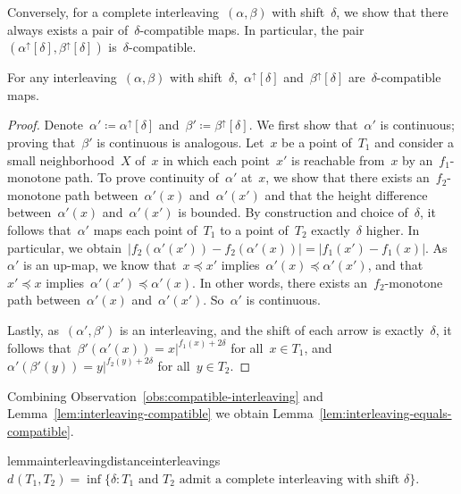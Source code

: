 \documentclass[a4paper,UKenglish, autoref, thm-restate, cleveref]{lipics-v2021}
\newcommand{\an}[2]{#1|^{#2}}
\newcommand{\intdist}[1]{d^{{#1}}}
\renewcommand{\mid}{:}
\begin{document}
\noindent
Conversely, for a complete interleaving~$(\alpha, \beta)$ with shift~$\delta$, we show that there always exists a pair of~$\delta$-compatible maps.
In particular, the pair~$(\alpha^\uparrow[\delta],\beta^\uparrow[\delta])$ is~$\delta$-compatible.

\begin{lemma}\label{lem:interleaving-compatible}
For any interleaving~$(\alpha, \beta)$ with shift~$\delta$,~$\alpha^\uparrow[\delta]$ and~$\beta^\uparrow[\delta]$ are~$\delta$-compatible maps.
\end{lemma}
\begin{proof}
    Denote~$\alpha' \coloneqq \alpha^\uparrow[\delta]$ and~$\beta' \coloneqq \beta^\uparrow[\delta]$.
	We first show that~$\alpha'$ is continuous; proving that~$\beta'$ is continuous is analogous.
	Let~$x$ be a point of~$T_1$ and consider a small neighborhood~$X$ of~$x$ in which each point~$x'$ is reachable from~$x$ by an~$f_1$-monotone path.
	To prove continuity of~$\alpha'$ at~$x$, we show that there exists an~$f_2$-monotone path between~$\alpha'(x)$ and~$\alpha'(x')$ and that the height difference between~$\alpha'(x)$ and~$\alpha'(x')$ is bounded.
    By construction and choice of~$\delta$, it follows that~$\alpha'$ maps each point of~$T_1$ to a point of~$T_2$ exactly~$\delta$ higher.
    In particular, we obtain~$|f_2(\alpha'(x')) - f_2(\alpha'(x))| = |f_1(x') - f_1(x)|$.
	As~$\alpha'$ is an up-map, we know that~$x \preceq x'$ implies~$\alpha'(x) \preceq \alpha'(x')$, and that~$x' \preceq x$ implies~$\alpha'(x') \preceq \alpha'(x)$.
    In other words, there exists an~$f_2$-monotone path between~$\alpha'(x)$ and~$\alpha'(x')$.
	So~$\alpha'$ is continuous.
	
	Lastly, as~$(\alpha', \beta')$ is an interleaving, and the shift of each arrow is exactly~$\delta$, it follows that~$\beta'(\alpha'(x)) = \an{x}{f_1(x) + 2\delta}$ for all~$x \in T_1$, and~$\alpha'(\beta'(y)) = \an{y}{f_2(y) + 2\delta}$ for all~$y \in T_2$.
\end{proof}

\noindent
Combining Observation~\ref{obs:compatible-interleaving} and Lemma~\ref{lem:interleaving-compatible} we obtain Lemma~\ref{lem:interleaving-equals-compatible}.

\begin{restatable}{lemma}{interleavingdistanceinterleavings}
\label{lem:interleaving-equals-compatible}
	$\intdist{}(T_1, T_2) = \inf\{\delta \mid T_1 \text{ and } T_2 \text{ admit a complete interleaving with shift } \delta \}$.
\end{restatable}
\end{document}
